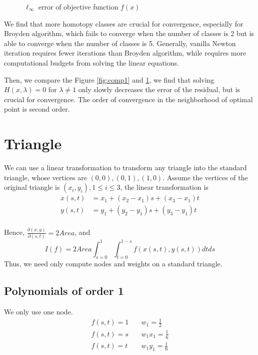 \documentclass[conference,onecolumn, 12pt]{IEEEtran}
\begin{document}
\begin{figure}[!htbp]
    \centering
    \subfigure[num of homotopy classes $=10$]{
    \resizebox{0.8\textwidth}{!}{
        
    }
    }
    \subfigure[num of homotopy classes $=5$]{
    \resizebox{0.8\textwidth}{!}{
        
    }
    }
    \subfigure[num of homotopy classes$=2$]{
    \resizebox{0.8\textwidth}{!}{
        
    }
    }
    \caption{$\ell_\infty$ error of objective function $f(x)$}
    \label{fig:comp2}
\end{figure}


We find that more homotopy classes are crucial for convergence, especially for Broyden algorithm, which fails to converge when the number of classes is 2 but is able to converge when the number of classes is 5. Generally, vanilla Newton iteration requires fewer iterations than Broyden algorithm, while requires more computational budgets from solving the linear equations.

Then, we compare the Figure \ref{fig:comp1} and \ref{fig:comp2}, we find that solving $H(x,\lambda)=0$ for $\lambda\neq 1$ only slowly decreases the error of the residual, but is crucial for convergence. The order of convergence in the neighborhood of optimal point is second order.
\section{Triangle}
We can use a linear transformation to transform any triangle into the standard triangle, whose vertices are $(0,0), (0,1), (1,0)$. Assume the vertices of the original triangle is $(x_i,y_i),1\leq i\leq 3$, the linear transformation is 
\begin{equation}
    \begin{split}
        x(s,t) &= x_1+(x_2-x_1)s+(x_3-x_1)t\\
        y(s,t) &= y_1+(y_2-y_1)s+(y_3-y_1)t\\
    \end{split}
\end{equation}

Hence, $\frac{\partial(x,y)}{\partial(s,t)}=2Area$, and 
\begin{equation}
    I(f) = 2Area \int_{s=0}^1\int_{t=0}^{1-s} f(x(s,t),y(s,t)) dtds
\end{equation}
Thus, we need only compute nodes and weights on a standard triangle.
\subsection{Polynomials of order 1}
We only use one node.
\begin{subequations}
    \begin{align}
        f(s,t)=1&\quad w_1=\frac{1}{2}\\
        f(s,t)=s&\quad w_1x_1=\frac{1}{6}\\
        f(s,t)=t&\quad w_1y_1=\frac{1}{6}
    \end{align}
\end{subequations}
\end{document}
